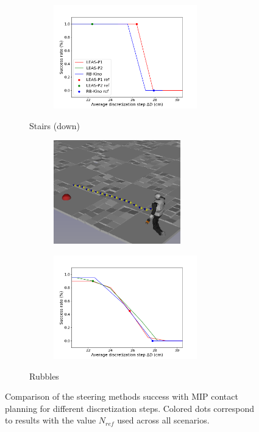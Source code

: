 \begin{figure}[h!]
\begin{subfigure}{0.9\linewidth}
\begin{subfigure}{0.48\linewidth}
        \end{subfigure}
        \begin{subfigure}{0.48\linewidth}
            \includegraphics[trim={0cm 0cm 2cm 1.8cm}, clip,width=\textwidth,height=4.5cm]{Figures/Chapter_MIP_SL1M/res_mip/MIP_stairs/FIGURE_MIP_STAIRS_DOWN_2.png}
        \end{subfigure}
        \caption{Stairs (down)}
        \label{fig:mip:minimizing_basic:1}
    \end{subfigure}
    \begin{subfigure}{0.9\linewidth}
        \centering
        \begin{subfigure}{0.48\linewidth}
            \includegraphics[trim={0cm 0cm 0cm 0cm},clip,width=\textwidth,height=4.5cm]{Figures/Chapter_MIP_SL1M/res_mip/scenario_rubbles.png}
        \end{subfigure}
        \begin{subfigure}{0.48\linewidth}
            \includegraphics[trim={0cm 0cm 2cm 1.8cm}, clip,width=\textwidth,height=4.5cm]{Figures/Chapter_MIP_SL1M/res_mip/MIP_res_rubbles/FIGURE_MIP_RUBBLES_2.png}
        \end{subfigure}
        \caption{Rubbles}
        \label{fig:mip:minimizing_basic:2}
    \end{subfigure}
    \caption{Comparison of the steering methods success with MIP contact planning for different discretization steps. Colored dots correspond to results with the value $N_{ref}$ used across all scenarios.}
    \label{fig:mip:minimizing_basic}
\end{figure}
